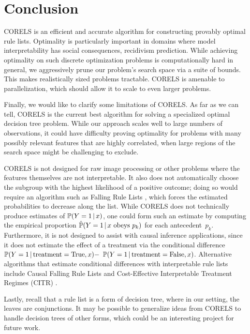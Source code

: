 \section{Conclusion}

CORELS is an efficient and accurate algorithm for constructing provably optimal rule lists.
%
Optimality is particularly important in domains where model interpretability
has social consequences, \eg recidivism prediction.
%
While achieving optimality on such discrete optimization problems is
computationally hard in general, we aggressively prune our problem's search space
via a suite of bounds.
%
This makes realistically sized problems tractable.
%
CORELS is amenable to parallelization, which should allow it to scale to
even larger problems.

\begin{arxiv}
Finally, we would like to clarify some limitations of CORELS.
%
As far as we can tell, CORELS is the current best algorithm for solving a
specialized optimal decision tree problem.
%
While our approach scales well to large numbers of observations,
it could have difficulty proving optimality
for problems with many possibly relevant features that are highly correlated,
when large regions of the search space might be challenging to exclude.

CORELS is not designed for raw image processing or other problems where the features
themselves are not interpretable.
%
It also does not automatically choose the subgroup with the highest likelihood of a
positive outcome; doing so would require an algorithm such as Falling Rule Lists \citep{WangRu15},
which forces the estimated probabilities to decrease along the list.
%
While CORELS does not technically produce estimates of ${\mathbb{P}(Y=1 \,|\, x)}$,
one could form such an estimate by computing the empirical
proportion ${\hat{\mathbb{P}}(Y=1 \,|\, x \textrm{ obeys } p_k)}$ for each antecedent~$p_k$.
%
Furthermore, it is not designed to assist with causal inference applications, since
it does not estimate the effect of a treatment via the conditional difference
${\mathbb{P}(Y=1 \,|\, \textrm{treatment} = \textrm{True}, x) -}$ ${\mathbb{P}(Y=1 \,|\, \textrm{treatment} = \textrm{False}, x)}$.
%
Alternative algorithms that estimate conditional differences with interpretable
rule lists include Causal Falling Rule Lists \citep{WangRu16}
and Cost-Effective Interpretable Treatment Regimes (CITR) \citep{LakkarajuRu17}.

Lastly, recall that a rule list is a form of decision tree,
where in our setting, the leaves are conjunctions.
%
It may be possible to generalize ideas from CORELS to handle decision trees of
other forms, which could be an interesting project for future work.
\end{arxiv}
